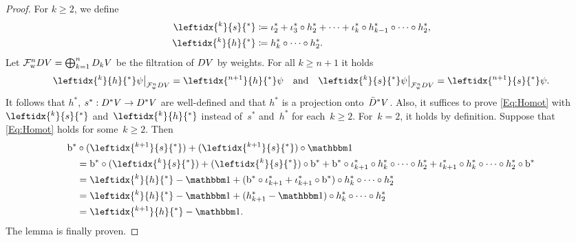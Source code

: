 \documentclass[\MainFolder/Text.tex]{subfiles}
\begin{document}
\begin{proof}
For $k\ge 2$, we define
\begin{align*}
 \leftidx{^k}{s}{^*} &\coloneqq \InsOneOp_2^* +  \InsOneOp_3^* \circ h_2^* + \dotsb + \InsOneOp_k^* \circ h_{k-1}^* \circ \dotsb \circ h_2^*, \\
 \leftidx{^k}{h}{^*} &\coloneqq h_k^* \circ \dotsb \circ h_2^*.
\end{align*}
Let $\mathcal{F}^n_{\mathrm{w}} D V = \bigoplus_{k=1}^n D_k V$ be the filtration of $D V$ by weights. For all $k\ge n+1$ it holds
$$ \Restr{\leftidx{^{k}}{h}{^*}\psi}{\Filtr^n_{\WeightMRM} \HC V} = \leftidx{^{n+1}}{h}{^*}\psi\quad\text{and}\quad \Restr{\leftidx{^k}{s}{^*}\psi}{\Filtr^n_{\WeightMRM} \HC V} = \leftidx{^{n+1}}{s}{^*}\psi. $$
It follows that $h^*$, $s^*: D^* V \rightarrow D^* V$ are well-defined and that $h^*$ is a projection onto~$\bar{D}^* V$. Also, it suffices to prove  \eqref{Eq:Homot} with~$\leftidx{^k}{s}{^*}$ and~$\leftidx{^k}{h}{^*}$ instead of~$s^*$ and~$h^*$ for each~$k\ge 2$. For~$k=2$, it holds by definition. Suppose that \eqref{Eq:Homot} holds for some~$k\ge 2$. Then
\begin{align*}
&\Hd^*\circ (\leftidx{^{k+1}}{s}{^*}) + (\leftidx{^{k+1}}{s}{^*})\circ \Id \\
&\quad = \Hd^*\circ (\leftidx{^{k}}{s}{^*}) + (\leftidx{^{k}}{s}{^*}) \circ \Hd^* + \Hd^*\circ \InsOneOp_{k+1}^*\circ h_k^*\circ \dotsb \circ h_2^* + \InsOneOp_{k+1}^*\circ h_k^*  \circ \dotsb \circ h_2^* \circ \Hd^* \\
&\quad = \leftidx{^k}{h}{^*}- \Id + (\Hd^*\circ \InsOneOp_{k+1}^* + \InsOneOp_{k+1}^*\circ \Hd^*)\circ h_k^* \circ \dotsb \circ h_2^*  \\
&\quad = \leftidx{^k}{h}{^*}- \Id + (h_{k+1}^* - \Id)\circ h_k^* \circ \dotsb \circ h_2^* \\
&\quad = \leftidx{^{k+1}}{h}{^*} - \Id.
\end{align*}
The lemma is finally proven.\qedhere
\end{proof}
%
\end{document}
